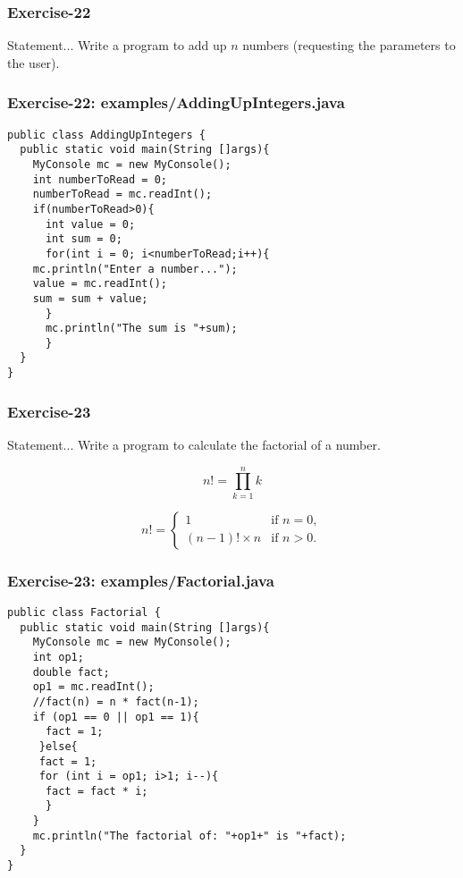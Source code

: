 \documentclass[xcolor=dvipsnames,dvip,notes=show,table]{beamer}
\begin{document}
\begin{frame}[fragile]
\frametitle{Exercise-22}
\begin{block}{Statement...}
Write a program to add up $n$ numbers (requesting the parameters to the user).
\end{block}

\end{frame}


\begin{frame}[fragile]
\frametitle{Exercise-22: examples/AddingUpIntegers.java}
\scriptsize
\begin{lstlisting}
public class AddingUpIntegers {
  public static void main(String []args){
    MyConsole mc = new MyConsole();
    int numberToRead = 0;
    numberToRead = mc.readInt();
    if(numberToRead>0){
      int value = 0;
      int sum = 0;
      for(int i = 0; i<numberToRead;i++){
	mc.println("Enter a number...");
	value = mc.readInt();
	sum = sum + value;
      }
      mc.println("The sum is "+sum);
      }
  }
}
\end{lstlisting}
\end{frame}




\begin{frame}[fragile]
\frametitle{Exercise-23}
\begin{block}{Statement...}
Write a program to calculate the factorial of a number.
\end{block}


\begin{equation}
n!=\prod_{k=1}^n k \!  
\end{equation}


\begin{equation}
n! = \begin{cases}
1 & \text{if } n = 0, \\
(n-1)!\times n & \text{if } n > 0.
\end{cases}
\end{equation}


\end{frame}


\begin{frame}[fragile]
\frametitle{Exercise-23: examples/Factorial.java}
\scriptsize
\begin{lstlisting}
public class Factorial {
  public static void main(String []args){
    MyConsole mc = new MyConsole();
    int op1;
    double fact;
    op1 = mc.readInt();
    //fact(n) = n * fact(n-1);
    if (op1 == 0 || op1 == 1){
      fact = 1;
     }else{
     fact = 1;
     for (int i = op1; i>1; i--){
      fact = fact * i; 
      }
    }
    mc.println("The factorial of: "+op1+" is "+fact);
  }
}
\end{lstlisting}
\end{frame}
\end{document}
